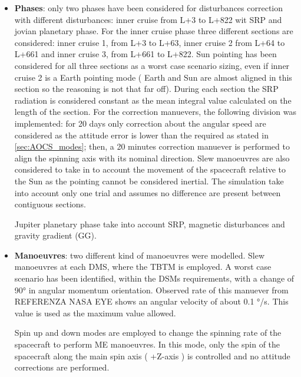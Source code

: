 \begin{itemize}
    \item \textbf{Phases}: only two phases have been considered for disturbances correction with different disturbances: inner cruise from L+3 to L+822 wit SRP and jovian planetary phase. For the inner cruise phase three different sections are considered: inner cruise 1, from L+3 to L+63, inner cruise 2 from L+64 to L+661 and inner cruise 3, from L+661 to L+822. Sun pointing has been considered for all three sections as a worst case scenario sizing, even if inner cruise 2 is a Earth pointing mode ( Earth and Sun are almost aligned in this section so the reasoning is not that far off). During each section the SRP radiation is considered constant as the mean integral value calculated on the length of the section. For the correction manuevers, the following division was implemented: for 20 days only correction about the angular speed are considered as the attitude error is lower than the required as stated in \autoref{sec:AOCS_modes}; then, a 20 minutes correction manuever is performed to align the spinning axis with its nominal direction. Slew manoeuvres are also considered to take in to account the movement of the spacecraft relative to the Sun as the pointing cannot be considered inertial. The simulation take into account only one trial and assumes no difference are present between contiguous sections. 
    
    Jupiter planetary phase take into account SRP, magnetic disturbances and gravity gradient (GG). 
    \item \textbf{Manoeuvres}: two different kind of manoeuvres were modelled. Slew manoeuvres at each DMS, where the TBTM is employed. A worst case scenario has been identified, within the DSMs requirements, with a change of 90° in angular momentum orientation. Observed rate of this manuever from REFERENZA NASA EYE shows an angular velocity of about 0.1 °/s. This value is used as the maximum value allowed. 
    
    Spin up and down modes are employed to change the spinning rate of the spacecraft to perform ME manoeuvres. In this mode, only the spin of the spacecraft along the main spin axis ( +Z-axis ) is controlled and no attitude corrections are performed.      

\end{itemize}


